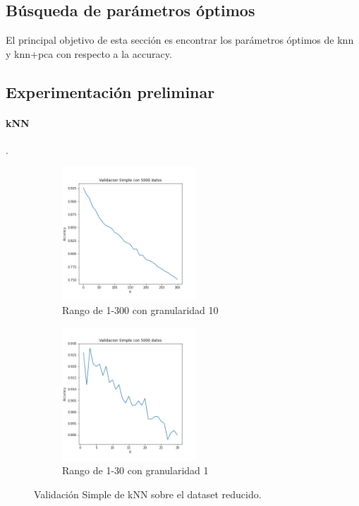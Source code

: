 
\subsection{Búsqueda de parámetros óptimos }

El principal objetivo de esta sección es encontrar los parámetros óptimos de knn y knn+pca con respecto a la accuracy. 

\subsection{Experimentación preliminar}


\paragraph{kNN}
.
\begin{figure}[h]
\begin{subfigure}{0.5\textwidth}
\includegraphics[width=0.9\linewidth, height=5cm]{images/validacionSimple_knnsolo.png} 
\caption{Rango de 1-300 con granularidad 10}
\label{fig:subimbar_medio1}
\end{subfigure}
\begin{subfigure}{0.5\textwidth}
\includegraphics[width=0.9\linewidth, height=5cm]{images/validacionSimple_knnsolo_Kchicos.png} 
\caption{Rango de 1-30 con granularidad 1}
\label{fig:subimbar_medio2}
\end{subfigure}
\caption{Validación Simple de kNN sobre el dataset reducido.}
\label{knn_preliminar}%
\end{figure}

